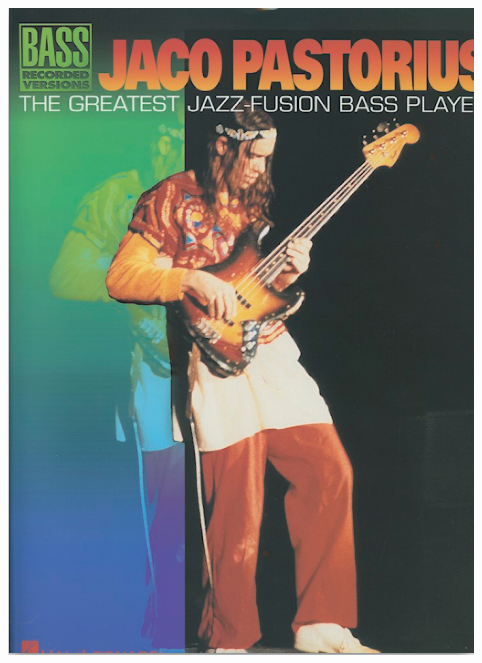 \documentclass[a4paper]{book}
\begin{document}
\begin{center}
\includegraphics[width=12.328cm,height=17.117cm]{lebluessupportsmethodes-img163.png}
\end{center}
\end{document}
